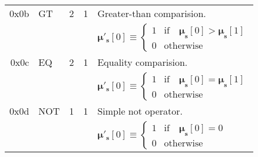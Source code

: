 \documentclass[9pt,oneside]{amsart}
\begin{document}
\begin{tabular*}{\columnwidth}[h]{rlrrl}
\midrule
0x0b & {\small GT} & 2 & 1 & Greater-than comparision. \\
&&&& $\boldsymbol{\mu}'_\mathbf{s}[0] \equiv \begin{cases} 1 & \text{if} \quad \boldsymbol{\mu}_\mathbf{s}[0] > \boldsymbol{\mu}_\mathbf{s}[1] \\ 0 & \text{otherwise} \end{cases}$ \\
\midrule
0x0c & {\small EQ} & 2 & 1 & Equality comparision. \\
&&&& $\boldsymbol{\mu}'_\mathbf{s}[0] \equiv \begin{cases} 1 & \text{if} \quad \boldsymbol{\mu}_\mathbf{s}[0] = \boldsymbol{\mu}_\mathbf{s}[1] \\ 0 & \text{otherwise} \end{cases}$ \\
\midrule
0x0d & {\small NOT} & 1 & 1 & Simple not operator. \\
&&&& $\boldsymbol{\mu}'_\mathbf{s}[0] \equiv \begin{cases} 1 & \text{if} \quad \boldsymbol{\mu}_\mathbf{s}[0] = 0 \\ 0 & \text{otherwise} \end{cases}$ \\
\end{tabular*}
\end{document}

